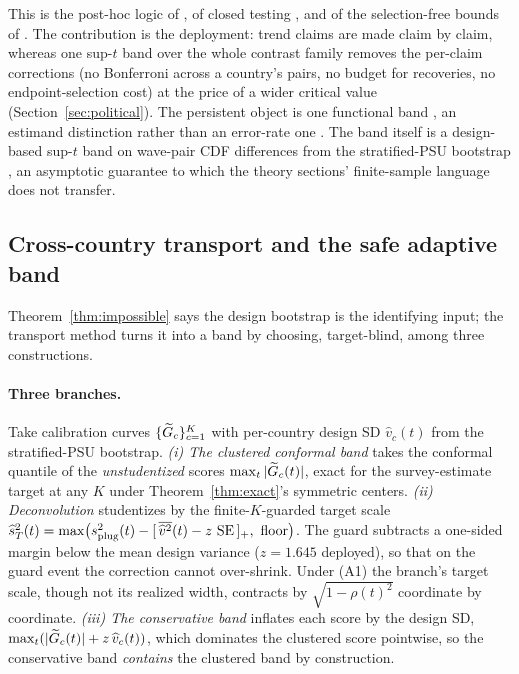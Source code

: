 This is the post-hoc logic of \citet{scheffe1953method}, of closed testing
\citep{marcus1976closed}, and of the selection-free bounds of
\citet{goeman2011multiple,katsevich2020simultaneous}. The contribution is
the deployment: trend claims are made claim by claim, whereas one sup-$t$
band over the whole contrast family removes the per-claim corrections (no
Bonferroni across a country's pairs, no budget for recoveries, no
endpoint-selection cost) at the price of a wider critical value
(Section~\ref{sec:political}). The persistent object is one functional band
\citep{diquigiovanni2021conformal}, an estimand distinction rather than an
error-rate one \citep{gelman2012why,benjamini1995controlling}. The band itself is a
design-based sup-$t$ band on wave-pair CDF differences from the
stratified-PSU bootstrap \citep{rao1988resampling,wolter2007introduction},
an asymptotic guarantee to which the theory sections' finite-sample language
does not transfer.

\subsection{Cross-country transport and the safe adaptive band}
\label{sec:transport}

Theorem~\ref{thm:impossible} says the design bootstrap is the identifying
input; the transport method turns it into a band by choosing, target-blind,
among three constructions.

\paragraph{Three branches.} Take calibration curves $\{\widetilde{G}_c\}_{c=1}^K$
with per-country design SD $\widehat v_c(t)$ from the stratified-PSU
bootstrap. \emph{(i) The clustered conformal band} takes the conformal
quantile of the \emph{unstudentized} scores $\max_t|\widetilde{G}_c(t)|$, exact
for the survey-estimate target at any $K$ under Theorem~\ref{thm:exact}'s
symmetric centers. \emph{(ii) Deconvolution}
studentizes by the finite-$K$-guarded target scale
$\widehat s_{T}^2(t)=\max\!\big(s_{\text{plug}}^2(t)-[\,\overline{\widehat v^2}(t)-z\,\operatorname{SE}\,]_+,\ \text{floor}\big)$.
The guard subtracts a one-sided margin below the mean design variance
($z=1.645$ deployed), so that on the guard event the correction cannot
over-shrink. Under (A1) the branch's target scale, though not its realized
width, contracts by $\sqrt{1-\rho(t)^2}$ coordinate by coordinate.
\emph{(iii) The conservative band} inflates each score by the design SD,
$\max_t(|\widetilde{G}_c(t)|+z\,\widehat v_c(t))$, which dominates the clustered
score pointwise, so the conservative band \emph{contains} the clustered band
by construction.

